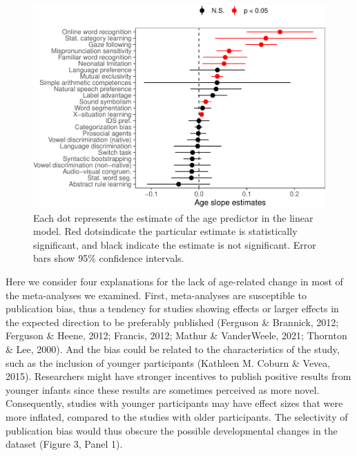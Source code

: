 \documentclass[
  man]{apa6}
\begin{document}
\begin{figure}
\centering
\includegraphics{00_main_files/figure-latex/unnamed-chunk-23-1.pdf}
\caption{\label{fig:unnamed-chunk-23}Each dot represents the estimate of the age predictor in the linear model. Red dotsindicate the particular estimate is statistically significant, and black indicate the estimate is not significant. Error bars show 95\% confidence intervals.}
\end{figure}

Here we consider four explanations for the lack of age-related change in most of the meta-analyses we examined. First, meta-analyses are susceptible to publication bias, thus a tendency for studies showing effects or larger effects in the expected direction to be preferably published (Ferguson \& Brannick, 2012; Ferguson \& Heene, 2012; Francis, 2012; Mathur \& VanderWeele, 2021; Thornton \& Lee, 2000). And the bias could be related to the characteristics of the study, such as the inclusion of younger participants (Kathleen M. Coburn \& Vevea, 2015). Researchers might have stronger incentives to publish positive results from younger infants since these results are sometimes perceived as more novel. Consequently, studies with younger participants may have effect sizes that were more inflated, compared to the studies with older participants. The selectivity of publication bias would thus obscure the possible developmental changes in the dataset (Figure 3, Panel 1).
\end{document}
